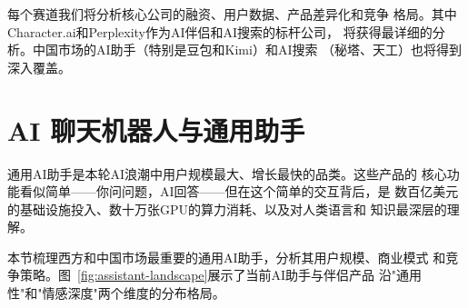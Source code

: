 每个赛道我们将分析核心公司的融资、用户数据、产品差异化和竞争
格局。其中Character.ai和Perplexity作为AI伴侣和AI搜索的标杆公司，
将获得最详细的分析。中国市场的AI助手（特别是豆包和Kimi）和AI搜索
（秘塔、天工）也将得到深入覆盖。


\section{AI 聊天机器人与通用助手}
\label{sec:social-assistants}

通用AI助手是本轮AI浪潮中用户规模最大、增长最快的品类。这些产品的
核心功能看似简单——你问问题，AI回答——但在这个简单的交互背后，是
数百亿美元的基础设施投入、数十万张GPU的算力消耗、以及对人类语言和
知识最深层的理解。

本节梳理西方和中国市场最重要的通用AI助手，分析其用户规模、商业模式
和竞争策略。图~\ref{fig:assistant-landscape}展示了当前AI助手与伴侣产品
沿"通用性"和"情感深度"两个维度的分布格局。

